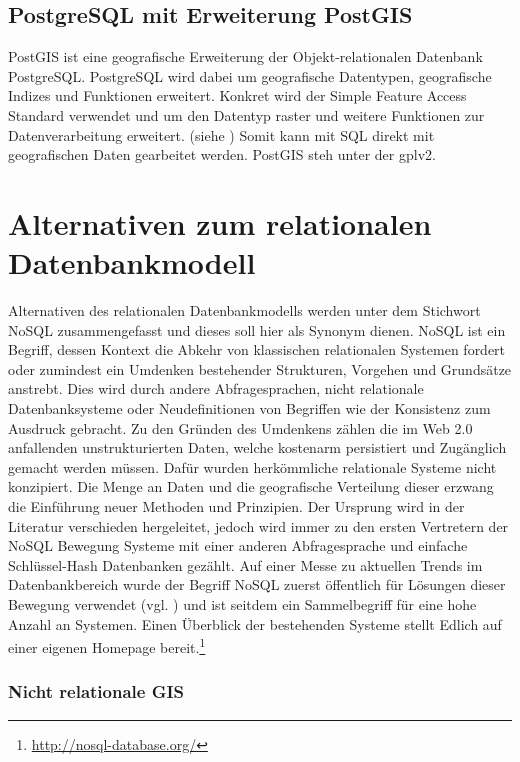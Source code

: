 \subsection{PostgreSQL mit Erweiterung PostGIS}
PostGIS ist eine geografische Erweiterung der Objekt-relationalen Datenbank PostgreSQL.
PostgreSQL wird dabei um geografische Datentypen, geografische Indizes und Funktionen erweitert.
Konkret wird der Simple Feature Access Standard verwendet und um den Datentyp raster und weitere Funktionen zur Datenverarbeitung erweitert. (siehe \cite{website:postgisdocu-opengis})
Somit kann mit SQL direkt mit geografischen Daten gearbeitet werden.
PostGIS steh unter der \Gls{gpl}v2.


\section{Alternativen zum relationalen Datenbankmodell}
\label{nosql}
Alternativen des relationalen Datenbankmodells werden unter dem Stichwort NoSQL zusammengefasst und dieses soll hier als Synonym dienen.
NoSQL ist ein Begriff, dessen Kontext die Abkehr von klassischen relationalen Systemen fordert oder zumindest ein Umdenken bestehender Strukturen, Vorgehen und Grundsätze anstrebt.
Dies wird durch andere Abfragesprachen, nicht relationale Datenbanksysteme oder Neudefinitionen von Begriffen wie der Konsistenz zum Ausdruck gebracht.
Zu den Gründen des Umdenkens zählen die im Web 2.0 anfallenden unstrukturierten Daten, welche kostenarm persistiert und Zugänglich gemacht werden müssen.
Dafür wurden herkömmliche relationale Systeme nicht konzipiert.
Die Menge an Daten und die geografische Verteilung dieser erzwang die Einführung neuer Methoden und Prinzipien.
Der Ursprung wird in der Literatur verschieden hergeleitet, jedoch wird immer zu den ersten Vertretern der NoSQL Bewegung Systeme mit einer anderen Abfragesprache und einfache Schlüssel-Hash Datenbanken gezählt.
Auf einer Messe zu aktuellen Trends im Datenbankbereich wurde der Begriff NoSQL zuerst öffentlich für Lösungen dieser Bewegung verwendet (vgl. \cite{website:originnosql}) und ist seitdem ein Sammelbegriff für eine hohe Anzahl an Systemen.
Einen Überblick der bestehenden Systeme stellt Edlich auf einer eigenen Homepage bereit.\footnote{\url{http://nosql-database.org/}}

\subsubsection{Nicht relationale GIS}

